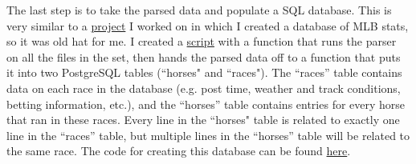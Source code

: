 \documentclass{article}
\begin{document}
The last step is to take the parsed data and populate a SQL database. This is very similar to a \href{https://github.com/Real-Karisch/baseballData}{project} I worked on in which I created a database of MLB stats, so it was old hat for me. I created a \href{https://github.com/Real-Karisch/horseData/blob/master/python/populateDB.py}{script} with a function that runs the parser on all the files in the set, then hands the parsed data off to a function that puts it into two PostgreSQL tables (``horses" and ``races"). The ``races'' table contains data on each race in the database (e.g. post time, weather and track conditions, betting information, etc.), and the ``horses'' table contains entries for every horse that ran in these races. Every line in the ``horses" table is related to exactly one line in the ``races'' table, but multiple lines in the ``horses'' table will be related to the same race. The code for creating this database can be found \href{https://github.com/Real-Karisch/horseData/blob/master/sql/horses.sql}{here}.
\end{document}

